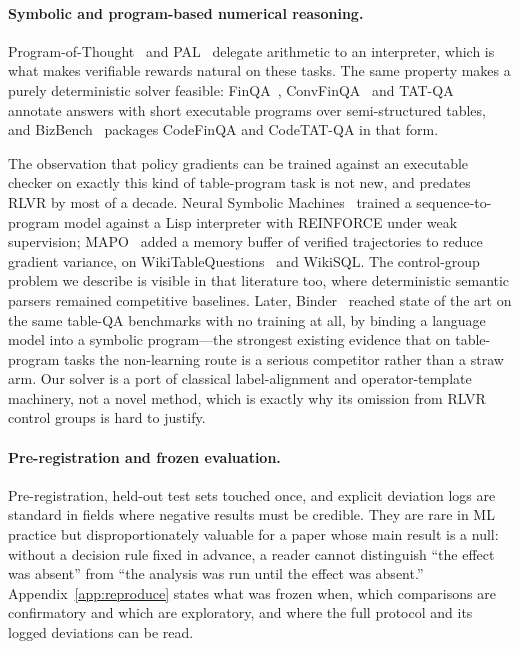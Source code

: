 \paragraph{Symbolic and program-based numerical reasoning.}
Program-of-Thought~\cite{pot2022} and PAL~\cite{pal2023} delegate arithmetic
to an interpreter, which is what makes verifiable rewards natural on these
tasks. The same property makes a purely deterministic solver feasible:
FinQA~\cite{finqa2021}, ConvFinQA~\cite{convfinqa2022} and
TAT-QA~\cite{tatqa2021} annotate answers with short executable programs over
semi-structured tables, and BizBench~\cite{bizbench2024} packages
CodeFinQA and CodeTAT-QA in that form.

The observation that policy gradients can be trained against an executable
checker on exactly this kind of table-program task is not new, and predates
RLVR by most of a decade. Neural Symbolic Machines~\cite{nsm2017} trained a
sequence-to-program model against a Lisp interpreter with REINFORCE under weak
supervision; MAPO~\cite{mapo2018} added a memory buffer of verified
trajectories to reduce gradient variance, on WikiTableQuestions~\cite{wtq2015}
and WikiSQL. The control-group problem we describe is visible in that
literature too, where deterministic semantic parsers remained competitive
baselines. Later, Binder~\cite{binder2023} reached state of the art on the same
table-QA benchmarks with no training at all, by binding a language model into a
symbolic program---the strongest existing evidence that on table-program tasks
the non-learning route is a serious competitor rather than a straw arm. Our
solver is a port of classical label-alignment and operator-template machinery,
not a novel method, which is exactly why its omission from RLVR control groups
is hard to justify.

\paragraph{Pre-registration and frozen evaluation.}
Pre-registration, held-out test sets touched once, and explicit deviation logs
are standard in fields where negative results must be credible. They are rare
in ML practice but disproportionately valuable for a paper whose main result is
a null: without a decision rule fixed in advance, a reader cannot distinguish
``the effect was absent'' from ``the analysis was run until the effect was
absent.'' Appendix~\ref{app:reproduce} states what was frozen when, which
comparisons are confirmatory and which are exploratory, and where the full
protocol and its logged deviations can be read.
